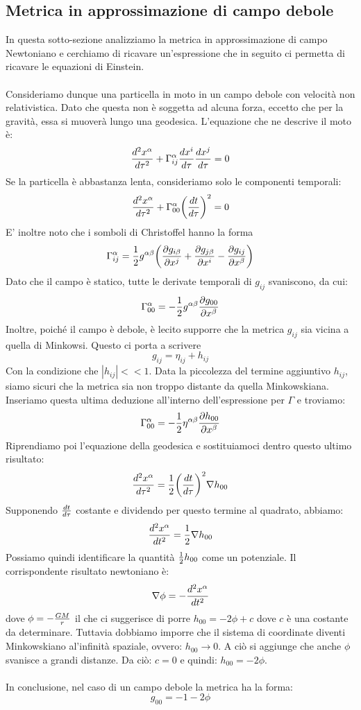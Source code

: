\documentclass[]{report}
\theoremstyle{definition}
\theoremstyle{Theorem}
\theoremstyle{definition}
\theoremstyle{definition}
\theoremstyle{definition}
\begin{document}
\subsection{Metrica in approssimazione di campo debole}
In questa sotto-sezione analizziamo la metrica in approssimazione di campo Newtoniano e cerchiamo di ricavare un'espressione che in seguito ci permetta di ricavare le equazioni di Einstein.\\
\\
Consideriamo dunque una particella in moto in un campo debole con velocità non relativistica. Dato che questa non è soggetta ad alcuna forza, eccetto che per la gravità, essa si muoverà lungo una geodesica. L'equazione che ne descrive il moto è:
$${d^2x^\alpha\over d\tau^2}+\Gamma^\alpha_{ij}{dx^i\over d\tau}{dx^j\over d\tau}=0$$ 
Se la particella è abbastanza lenta, consideriamo solo le componenti temporali:
$${d^2x^\alpha\over d\tau^2}+\Gamma^\alpha_{00}\bigg{(}{dt\over d\tau}\bigg{)}^2=0$$
E' inoltre noto che i somboli di Christoffel hanno la forma
$$\Gamma_{ij}^\alpha={1\over 2}g^{\alpha\beta}\bigg{(}{\partial g_{i\beta}\over \partial x^j}+{\partial g_{j\beta}\over \partial x^i}-{\partial g_{ij}\over \partial x^\beta}\bigg{)}$$
Dato che il campo è statico, tutte le derivate temporali di $g_{ij}$ svaniscono, da cui:
$$\Gamma^\alpha_{00}=-{1\over 2}g^{\alpha\beta}{\partial g_{00}\over \partial x^\beta}$$
Inoltre, poiché il campo è debole, è lecito supporre che la metrica $g_{ij}$ sia vicina a quella di Minkowsi. Questo ci porta a scrivere
$$g_{ij}=\eta_{ij}+h_{ij}$$
Con la condizione che $|h_{ij}|<<1$. Data la piccolezza del termine aggiuntivo $h_{ij}$, siamo sicuri che la metrica sia non troppo distante da quella Minkowskiana. Inseriamo questa ultima deduzione all'interno dell'espressione per $\Gamma$ e troviamo:
$$\Gamma^\alpha_{00}=-{1\over 2}\eta^{\alpha\beta}{\partial h_{00}\over \partial x^\beta}$$
Riprendiamo poi l'equazione della geodesica e sostituiamoci dentro questo ultimo risultato:
$${d^2x^\alpha\over d\tau^2}={1\over 2}\bigg{(}{dt\over d\tau}\bigg{)}^2\nabla h_{00}$$
Supponendo $dt\over d\tau$ costante e dividendo per questo termine al quadrato, abbiamo:
$${d^2x^\alpha\over dt^2}={1\over 2}\nabla h_{00}$$
Possiamo quindi identificare la quantità ${1\over 2}h_{00}$ come un potenziale. Il corrispondente risultato newtoniano è:
$$\nabla\phi=-{d^2x^\alpha\over dt^2}$$
dove $\phi=-{GM\over r}$
il che ci suggerisce di porre $h_{00}=-2\phi+c$ dove $c$ è una costante da determinare. Tuttavia dobbiamo imporre che il sistema di coordinate diventi Minkowskiano al'infinità spaziale, ovvero: $h_{00}\rightarrow 0$. A ciò si aggiunge che anche $\phi$ svanisce a grandi distanze. Da ciò: $c=0$ e quindi: $h_{00}=-2\phi$.\\
\\
In conclusione, nel caso di un campo debole la metrica ha la forma:
$$g_{00}=-1-2\phi$$
\end{document}
